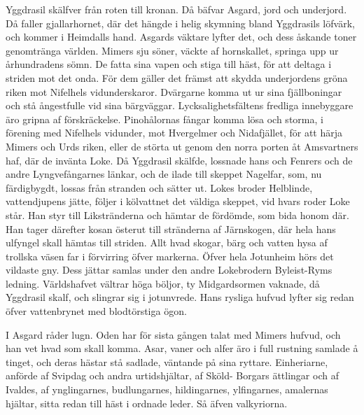 Yggdrasil skälfver från roten till kronan. Då bäfvar Asgard, jord och
underjord. Då faller gjallarhornet, där det hängde i helig skymning
bland Yggdrasils löfvärk, och kommer i Heimdalls hand. Asgards väktare
lyfter det, och dess åskande toner genomtränga världen. Mimers sju
söner, väckte af hornskallet, springa upp ur århundradens sömn. De fatta
sina vapen och stiga till häst, för att deltaga i striden mot det onda.
För dem gäller det främst att skydda underjordens gröna riken mot
Nifelhels vidunderskaror. Dvärgarne
\protect\hypertarget{lb1625905.xhtmlux5cux23start193}{}{}\protect\hypertarget{lb1625905.xhtmlux5cux23start193-a}{}{}\protect\hypertarget{lb1625905.xhtmlux5cux23start193-b}{}{}\protect\hypertarget{lb1625905.xhtmlux5cux23start193-c}{}{}\protect\hypertarget{lb1625905.xhtmlux5cux23start193-d}{}{}
komma ut ur sina fjällboningar och stå ångestfulle vid sina bärgväggar.
Lycksalighetsfältens fredliga innebyggare äro gripna af förskräckelse.
Pinohålornas fångar komma lösa och storma, i förening med Nifelhels
vidunder, mot Hvergelmer och Nidafjället, för att härja Mimers och Urds
riken, eller de störta ut genom den norra porten åt Amsvartners haf, där
de invänta Loke. Då Yggdrasil skälfde, lossnade hans och Fenrers och de
andre Lyngvefångarnes länkar, och de ilade till skeppet Nagelfar, som,
nu färdigbygdt, lossas från stranden och sätter ut. Lokes broder
Helblinde, vattendjupens jätte, följer i kölvattnet det väldiga skeppet,
vid hvars roder Loke står. Han styr till Likstränderna och hämtar de
fördömde, som bida honom där. Han tager därefter kosan österut till
stränderna af Järnskogen, där hela hans ulfyngel skall hämtas till
striden. Allt hvad skogar, bärg och vatten hysa af trollska väsen far i
förvirring öfver markerna. Öfver hela Jotunheim hörs det vildaste gny.
Dess jättar samlas under den andre Lokebrodern Byleist-Ryms ledning.
Världshafvet vältrar höga böljor, ty Midgardsormen vaknade, då Yggdrasil
skalf, och slingrar sig i jotunvrede. Hans rysliga hufvud lyfter sig
redan öfver vattenbrynet med blodtörstiga ögon.

I Asgard råder lugn. Oden har för sista gången talat med Mimers hufvud,
och han vet hvad som skall komma. Asar, vaner och alfer äro i full
rustning samlade å tinget, och deras hästar stå sadlade, väntande på
sina ryttare. Einheriarne, anförde af Svipdag och andra urtidshjältar,
af Sköld- Borgars ättlingar och af Ivaldes, af ynglingarnes,
budlungarnes, hildingarnes, ylfingarnes, amalernas hjältar, sitta redan
till häst i ordnade leder. Så äfven valkyriorna.

